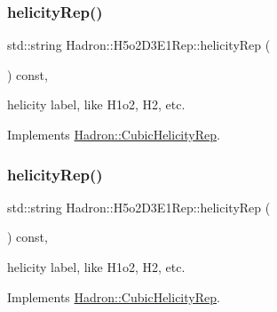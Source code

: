\mbox{\label{structHadron_1_1H5o2D3E1Rep_a8b5b9e72ba3d6656c0c77e111bdd140a}} 
\subsubsection{\texorpdfstring{helicityRep()}{helicityRep()}\hspace{0.1cm}{\footnotesize\ttfamily [1/2]}}
{\footnotesize\ttfamily std\+::string Hadron\+::\+H5o2\+D3\+E1\+Rep\+::helicity\+Rep (\begin{DoxyParamCaption}{ }\end{DoxyParamCaption}) const\hspace{0.3cm}{\ttfamily [inline]}, {\ttfamily [virtual]}}

helicity label, like H1o2, H2, etc. 

Implements \mbox{\hyperlink{structHadron_1_1CubicHelicityRep_af1096946b7470edf0a55451cc662f231}{Hadron\+::\+Cubic\+Helicity\+Rep}}.

\mbox{\label{structHadron_1_1H5o2D3E1Rep_a8b5b9e72ba3d6656c0c77e111bdd140a}} 
\subsubsection{\texorpdfstring{helicityRep()}{helicityRep()}\hspace{0.1cm}{\footnotesize\ttfamily [2/2]}}
{\footnotesize\ttfamily std\+::string Hadron\+::\+H5o2\+D3\+E1\+Rep\+::helicity\+Rep (\begin{DoxyParamCaption}{ }\end{DoxyParamCaption}) const\hspace{0.3cm}{\ttfamily [inline]}, {\ttfamily [virtual]}}

helicity label, like H1o2, H2, etc. 

Implements \mbox{\hyperlink{structHadron_1_1CubicHelicityRep_af1096946b7470edf0a55451cc662f231}{Hadron\+::\+Cubic\+Helicity\+Rep}}.

\mbox{\label{structHadron_1_1H5o2D3E1Rep_a08df80842b4ad843fc04e24eb3febd57}} 
